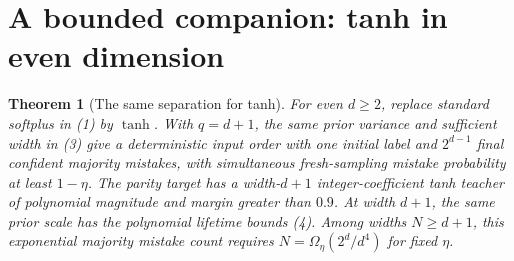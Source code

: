 \documentclass[11pt]{article}
\newtheorem{theorem}{Theorem}\newtheorem{lemma}[theorem]{Lemma}
\begin{document}
\section{A bounded companion: tanh in even dimension}\label{sec:tanh}
\begin{theorem}[The same separation for tanh]
For even $d\ge2$, replace standard softplus in (1) by $\tanh$.
With $q=d+1$, the same prior variance and sufficient width in (3)
give a deterministic input order with one initial label and $2^{d-1}$
final confident majority mistakes, with simultaneous fresh-sampling
mistake probability at least $1-\eta$.
The parity target has a width-$d+1$ integer-coefficient tanh teacher
of polynomial magnitude and margin greater than $0.9$. At width
$d+1$, the same prior scale has the polynomial lifetime bounds (4).
Among widths $N\ge d+1$, this exponential majority mistake count
requires $N=\Omega_\eta(2^d/d^4)$ for fixed $\eta$.
\end{theorem}
\end{document}
